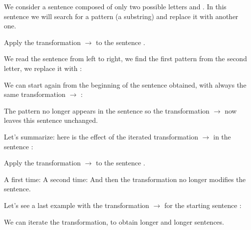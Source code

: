 \documentclass[11pt,class=report,crop=false]{standalone}
\begin{document}
\begin{cours}

We consider a \og{}sentence\fg{} composed of only two possible letters 
\rzero{} and \run. In this sentence we will search for a pattern (a substring) and replace it with another one.

\begin{exemple}
Apply the transformation \rzero\run{} $\rightarrow$ \run\rzero{}
to the sentence \run\rzero\run\run\rzero.

We read the sentence from left to right, we find the first pattern \rzero\run{} from the second letter, we replace it with \run\rzero{}:
\mycenterline{\run(\rzero\run)\run\rzero{} \quad $\longmapsto$ \quad \run(\run\rzero)\run\rzero}

We can start again from the beginning of the sentence obtained, with always the same transformation \rzero\run{} $\rightarrow$ \run\rzero{}:
\mycenterline{\run\run(\rzero\run)\rzero{} \quad $\longmapsto$ \quad \run\run(\run\rzero)\rzero}

The pattern \rzero\run{} no longer appears in the sentence \run\run\run\rzero\rzero{} so
the transformation \rzero\run{} $\rightarrow$\run\rzero{} now leaves this sentence unchanged.

Let's summarize: here is the effect of the iterated transformation \rzero\run{} $\rightarrow$ \run\rzero{} in the sentence \run\rzero\run\run\rzero{}:
\mycenterline{\run\rzero\run\run\rzero{} \quad $\longmapsto$ \quad \run\run\rzero\run\rzero{} \quad $\longmapsto$ \quad \run\run\run\rzero\rzero}
\end{exemple}

\begin{exemple}
Apply the transformation \rzero\rzero\run{} $\rightarrow$\run\run\rzero\rzero{}
to the sentence \rzero\rzero\run\run.

A first time:
\mycenterline{(\rzero\rzero\run)\run{} \quad $\longmapsto$ \quad (\run\run\rzero\rzero)\run}
A second time:
\mycenterline{\run\run(\rzero\rzero\run) \quad $\longmapsto$ \quad \run\run(\run\run\rzero\rzero)}
And then the transformation no longer modifies the sentence.
\end{exemple}

\begin{exemple}
Let's see a last example with the transformation \rzero\run{} $\rightarrow$\run\run\rzero\rzero{} for the starting sentence \rzero\rzero\rzero\run{}: 
\mycenterline{
\rzero\rzero\rzero\run{} \quad $\longmapsto$ \quad 
\rzero\rzero\run\run\rzero\rzero{} \quad $\longmapsto$ \quad 
\rzero\run\run\rzero\rzero\run\rzero\rzero{} \quad $\longmapsto$ \quad 
\run\run\rzero\rzero\run\rzero\rzero\run\rzero\rzero{} \quad $\longmapsto$ \quad $\cdots$}

We can iterate the transformation, to obtain longer and longer sentences.
\end{exemple}


\end{cours}
\end{document}
